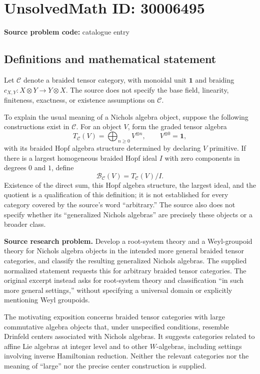 \documentclass[11pt]{article}
\begin{document}
\section*{UnsolvedMath ID: 30006495}
\textbf{Source problem code:} catalogue entry
\subsection{Definitions and mathematical statement}
Let \(\mathcal C\) denote a braided tensor category, with monoidal unit \(\mathbf 1\) and braiding \(c_{X,Y}:X\otimes Y\to Y\otimes X\). The source does not specify the base field, linearity, finiteness, exactness, or existence assumptions on \(\mathcal C\).

To explain the usual meaning of a Nichols algebra object, suppose the following constructions exist in \(\mathcal C\). For an object \(V\), form the graded tensor algebra
\[
T_{\mathcal C}(V)=\bigoplus_{n\geq 0}V^{\otimes n},\qquad V^{\otimes 0}=\mathbf 1,
\]
with its braided Hopf algebra structure determined by declaring \(V\) primitive. If there is a largest homogeneous braided Hopf ideal \(I\) with zero components in degrees \(0\) and \(1\), define
\[
\mathcal B_{\mathcal C}(V)=T_{\mathcal C}(V)/I.
\]
Existence of the direct sum, this Hopf algebra structure, the largest ideal, and the quotient is a qualification of this definition; it is not established for every category covered by the source's word ``arbitrary.'' The source also does not specify whether its ``generalized Nichols algebras'' are precisely these objects or a broader class.

\textbf{Source research problem.} Develop a root-system theory and a Weyl-groupoid theory for Nichols algebra objects in the intended more general braided tensor categories, and classify the resulting generalized Nichols algebras. The supplied normalized statement requests this for arbitrary braided tensor categories. The original excerpt instead asks for root-system theory and classification ``in such more general settings,'' without specifying a universal domain or explicitly mentioning Weyl groupoids.

The motivating exposition concerns braided tensor categories with large commutative algebra objects that, under unspecified conditions, resemble Drinfeld centers associated with Nichols algebras. It suggests categories related to affine Lie algebras at integer level and to other \(W\)-algebras, including settings involving inverse Hamiltonian reduction. Neither the relevant categories nor the meaning of ``large'' nor the precise center construction is supplied.
\end{document}
